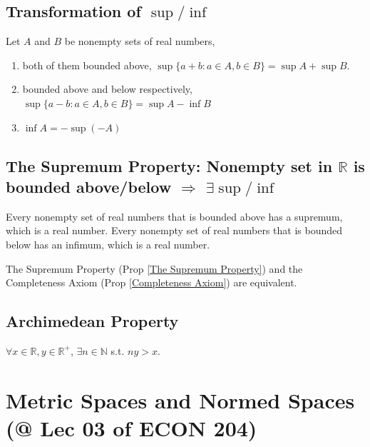 \documentclass[11pt]{elegantbook}
\begin{document}
\subsection{Transformation of $\sup/\inf$}
\begin{theorem}
    Let $A$ and $B$ be nonempty sets of real numbers,
    \begin{enumerate}
        \item both of them bounded above, $\sup\{a+b:a\in A,b\in B\}=\sup A+\sup B$.
        \item bounded above and below respectively, $\sup\{a-b:a\in A,b\in B\}=\sup A-\inf B$
        \item $\inf A=-\sup(-A)$
    \end{enumerate}
\end{theorem}

\subsection{The Supremum Property: Nonempty set in $\mathbb{R}$ is bounded above/below $\Rightarrow$ $\exists \sup/\inf$}
\begin{proposition}\label{The Supremum Property}
    \normalfont
    Every nonempty set of real numbers that is bounded above has a supremum, which is a real number. Every nonempty set of real numbers that is bounded below has an infimum, which is a real number.
\end{proposition}

\begin{theorem}
    The Supremum Property (Prop \ref{The Supremum Property}) and the Completeness Axiom (Prop \ref{Completeness Axiom}) are equivalent.
\end{theorem}

\subsection{Archimedean Property}
\begin{theorem}
    $\forall x\in \mathbb{R}, y\in \mathbb{R}^+$, $\exists n\in \mathbb{N}$ s.t. $ny>x$.
\end{theorem}

\section{Metric Spaces and Normed Spaces \small{(@ Lec 03 of ECON 204)}}
\end{document}
